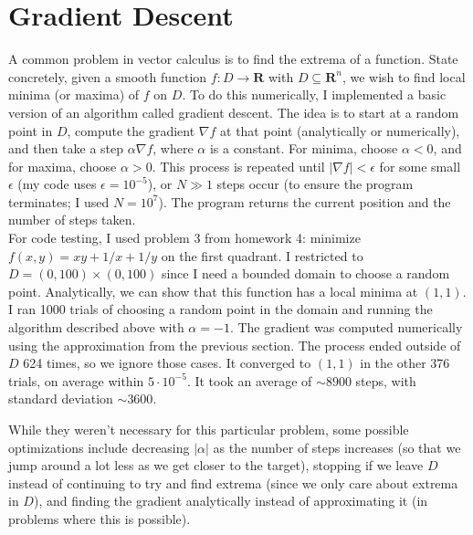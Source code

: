 \documentclass[11pt]{article}
\theoremstyle{plain}
\begin{document}
\section{Gradient Descent}
A common problem in vector calculus is to find the extrema of a function. State concretely, given a smooth function $f:D\to\mathbf{R}$ with $D\subseteq\mathbf{R}^n$, we wish to find local minima (or maxima) of $f$ on $D$. To do this numerically, I implemented a basic version of an algorithm called gradient descent. The idea is to start at a random point in $D$, compute the gradient $\nabla f$ at that point (analytically or numerically), and then take a step $\alpha \nabla f$, where $\alpha$ is a constant. For minima, choose $\alpha<0$, and for maxima, choose $\alpha>0$. This process is repeated until $|\nabla f|<\epsilon$ for some small $\epsilon$ (my code uses $\epsilon = 10^{-5}$), or $N\gg1$ steps occur (to ensure the program terminates; I used $N=10^7$). The program returns the current position and the number of steps taken. \\
\indent For code testing, I used problem 3 from homework 4: minimize $f(x,y) = xy + 1/x + 1/y$ on the first quadrant. I restricted to $D = (0,100)\times(0,100)$ since I need a bounded domain to choose a random point. Analytically, we can show that this function has a local minima at $(1,1)$. I ran 1000 trials of choosing a random point in the domain and running the algorithm described above with $\alpha = -1$. The gradient was computed numerically using the approximation from the previous section. The process ended outside of $D$ 624 times, so we ignore those cases. It converged to $(1,1)$ in the other 376 trials, on average within $5\cdot10^{-5}$. It took an average of $\sim 8900$ steps, with standard deviation $\sim 3600$. 
\par
\indent While they weren't necessary for this particular problem, some possible optimizations include decreasing $|\alpha|$ as the number of steps increases (so that we jump around a lot less as we get closer to the target), stopping if we leave $D$ instead of continuing to try and find extrema (since we only care about extrema in $D$), and finding the gradient analytically instead of approximating it (in problems where this is possible).
\end{document}

